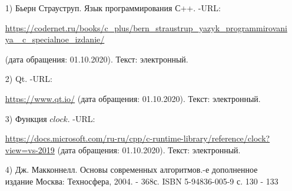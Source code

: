 \documentclass[12pt]{report}
\begin{document}
	\begin{enumerate}
		\label{CPlusPlus}
		\item[1)] Бьерн Страуструп. Язык программирования С++. -URL:\par 
		\href{https://codernet.ru/books/c_plus/bern_straustrup_yazyk_programmirovaniya_c_specialnoe_izdanie/}
		{https://codernet.ru/books/c\_plus/bern\_straustrup\_yazyk\_programmirovaniya\_
			c\_specialnoe\_izdanie/}\par(дата обращения:
		01.10.2020). Текст: электронный.
		
		\label{Cute}
		\item[2)] Qt. -URL:\par
		\href{https://www.qt.io/}{https://www.qt.io/} (дата обращения: 01.10.2020). Текст: электронный.
		
		\label{CLOCK}
		\item[3)] Функция $clock$. -URL:\par
		\href{https://docs.microsoft.com/ru-ru/cpp/c-runtime-library/reference/clock?view=vs-2019}{https://docs.microsoft.com/ru-ru/cpp/c-runtime-library/reference/clock?view=vs-2019} (дата обращения:
		01.10.2020). Текст: электронный.
		
		\label{MatrixInfo}
		\item[4)] Дж. Макконнелл. Основы современных алгоритмов.-е дополненное издание
		\newline Москва: Техносфера, 2004. - 368с. ISBN 5-94836-005-9\newline
		с. 130 - 133
		
	\end{enumerate}
	
\end{document}
